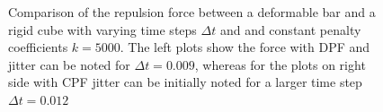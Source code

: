  \begin{figure}[h!] 
 \begin{minipage}[b]{0.50 \linewidth}
 		\centering
 	\end{minipage}
 	\begin{minipage}[b]{0.50 \linewidth}
 		\centering
 	\end{minipage}
 \caption[Comparison of the repulsion force between a deformable bar and a rigid cube with varying time steps $\Delta t$ and and constant penalty coefficients $k=5000$.]{Comparison of the repulsion force between a deformable bar and a rigid cube with varying time steps $\Delta t$ and and constant penalty coefficients $k=5000$. The left plots show the force with DPF and jitter can be noted for $\Delta t=0.009$, whereas for the plots on right side with CPF jitter can be initially noted for a larger time step $\Delta t=0.012$}
 \label{fig::BlockBM_dt}
 \end{figure} 

